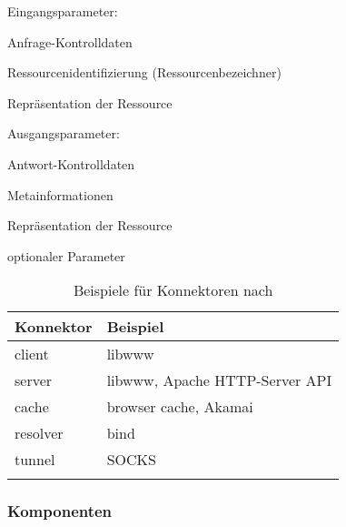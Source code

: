 Eingangsparameter:
\begin{compactitem}
    \item Anfrage-Kontrolldaten
    \item Ressourcenidentifizierung (Ressourcenbezeichner)
    \item[\textperiodcentered] Repräsentation der Ressource
\end{compactitem}
Ausgangsparameter:
\begin{compactitem}
    \item Antwort-Kontrolldaten
    \item[\textperiodcentered] Metainformationen
    \item[\textperiodcentered] Repräsentation der Ressource
\end{compactitem}

{\begin{center}\footnotesize\textperiodcentered optionaler Parameter\end{center}}


\begin{table}
    \begin{longtable}[c]{l l}
        \toprule
        \rowcolor{lightgray}
        \textbf{Konnektor}   & \textbf{Beispiel}\\
        \midrule
        client      & libwww\\
        server      & libwww, Apache HTTP-Server API\\
        cache       & browser cache, Akamai\\
        resolver    & bind\\
        tunnel      & SOCKS\\
        \bottomrule
        \caption{Beispiele für Konnektoren nach \cite{fieldingDissertation}}
        \label{tab:RESTconnectors}
    \end{longtable}
\end{table}       

\subsubsection{Komponenten}
\label{sec:RESTcomponents}


